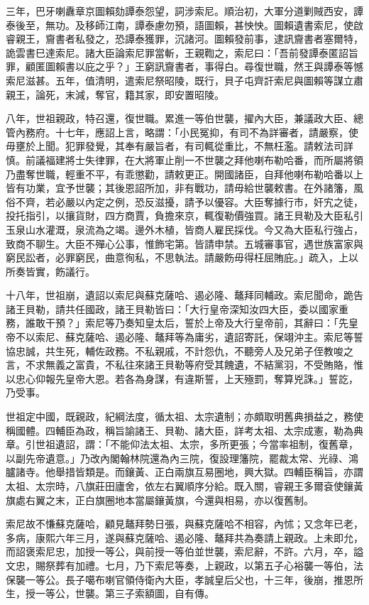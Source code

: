 \begin{pinyinscope}
三年，巴牙喇纛章京圖賴劾譚泰怨望，詞涉索尼。順治初，大軍分道剿賊西安，譚泰後至，無功。及移師江南，譚泰慮勿預，語圖賴，甚怏怏。圖賴遺書索尼，使啟睿親王，齎書者私發之，恐譚泰獲罪，沉諸河。圖賴發前事，逮訊齎書者塞爾特，詭雲書巳達索尼。諸大臣論索尼罪當斬，王親鞫之，索尼曰：「吾前發譚泰匿詔旨罪，顧匿圖賴書以庇之乎？」王窮訊齎書者，事得白。尋復世職，然王與譚泰等憾索尼滋甚。五年，值清明，遣索尼祭昭陵，既行，貝子屯齊訐索尼與圖賴等謀立肅親王，論死，末減，奪官，籍其家，即安置昭陵。

八年，世祖親政，特召還，復世職。累進一等伯世襲，擢內大臣，兼議政大臣、總管內務府。十七年，應詔上言，略謂：「小民冤抑，有司不為詳審者，請嚴察，使毋壅於上聞。犯罪發覺，其奉有嚴旨者，有司輒從重比，不無枉濫。請敕法司詳慎。前議福建將士失律罪，在大將軍止削一不世襲之拜他喇布勒哈番，而所屬將領乃盡奪世職，輕重不平，有乖懲勸，請敕更正。開國諸臣，自拜他喇布勒哈番以上皆有功業，宜予世襲；其後恩詔所加，非有戰功，請毋給世襲敕書。在外諸籓，風俗不齊，若必嚴以內定之例，恐反滋擾，請予以優容。大臣奪據行市，奸宄之徒，投托指引，以攘貨財，四方商賈，負擔來京，輒復勒價強買。諸王貝勒及大臣私引玉泉山水灌溉，泉流為之竭。邊外木植，皆商人雇民採伐。今又為大臣私行強占，致商不聊生。大臣不殫心公事，惟飾宅第。皆請申禁。五城審事官，遇世族富家與窮民訟者，必罪窮民，曲意徇私，不思執法。請嚴飭毋得枉屈賄庇。」疏入，上以所奏皆實，飭議行。

十八年，世祖崩，遺詔以索尼與蘇克薩哈、遏必隆、鼇拜同輔政。索尼聞命，跪告諸王貝勒，請共任國政，諸王貝勒皆曰：「大行皇帝深知汝四大臣，委以國家重務，誰敢干預？」索尼等乃奏知皇太后，誓於上帝及大行皇帝前，其辭曰：「先皇帝不以索尼、蘇克薩哈、遏必隆、鼇拜等為庸劣，遺詔寄託，保翊沖主。索尼等誓協忠誠，共生死，輔佐政務。不私親戚，不計怨仇，不聽旁人及兄弟子侄教唆之言，不求無義之富貴，不私往來諸王貝勒等府受其餽遺，不結黨羽，不受賄賂，惟以忠心仰報先皇帝大恩。若各為身謀，有違斯誓，上天殛罰，奪算兇誅。」誓訖，乃受事。

世祖定中國，既親政，紀綱法度，循太祖、太宗遺制；亦頗取明舊典損益之，務使稱國體。四輔臣為政，稱旨諭諸王、貝勒、諸大臣，詳考太祖、太宗成憲，勒為典章。引世祖遺詔，謂：「不能仰法太祖、太宗，多所更張；今當率祖制，復舊章，以副先帝遺意。」乃改內閣翰林院還為內三院，復設理籓院，罷裁太常、光祿、鴻臚諸寺。他舉措皆類是。而鑲黃、正白兩旗互易圈地，興大獄。四輔臣稱旨，亦謂太祖、太宗時，八旗莊田廬舍，依左右翼順序分給。既入關，睿親王多爾袞使鑲黃旗處右翼之末，正白旗圈地本當屬鑲黃旗，今還與相易，亦以復舊制。

索尼故不慊蘇克薩哈，顧見鼇拜勢日張，與蘇克薩哈不相容，內怵；又念年已老，多病，康熙六年三月，遂與蘇克薩哈、遏必隆、鼇拜共為奏請上親政。上未即允，而詔褒索尼忠，加授一等公，與前授一等伯並世襲，索尼辭，不許。六月，卒，謚文忠，賜祭葬有加禮。七月，乃下索尼等奏，上親政，以第五子心裕襲一等伯，法保襲一等公。長子噶布喇官領侍衛內大臣，孝誠皇后父也，十三年，後崩，推恩所生，授一等公，世襲。第三子索額圖，自有傳。


\end{pinyinscope}

